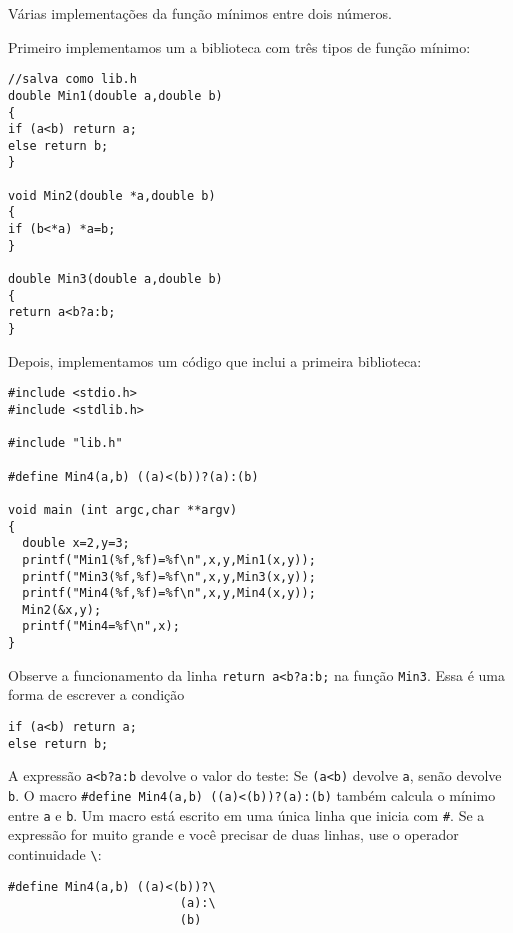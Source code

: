 \begin{ex}
Várias implementações da função mínimos entre dois números.
\end{ex}
Primeiro implementamos um a biblioteca com três tipos de função mínimo:
\begin{verbatim}
//salva como lib.h
double Min1(double a,double b)
{
if (a<b) return a;
else return b;
}

void Min2(double *a,double b)
{
if (b<*a) *a=b;
}

double Min3(double a,double b)
{
return a<b?a:b;
}
\end{verbatim}
Depois, implementamos um código que inclui a primeira biblioteca:
\begin{verbatim}
#include <stdio.h>
#include <stdlib.h>

#include "lib.h"

#define Min4(a,b) ((a)<(b))?(a):(b)

void main (int argc,char **argv)
{
  double x=2,y=3;
  printf("Min1(%f,%f)=%f\n",x,y,Min1(x,y));
  printf("Min3(%f,%f)=%f\n",x,y,Min3(x,y));
  printf("Min4(%f,%f)=%f\n",x,y,Min4(x,y));
  Min2(&x,y);
  printf("Min4=%f\n",x);
}
\end{verbatim}
Observe a funcionamento da linha \verb|return a<b?a:b;| na função \verb|Min3|. Essa é uma forma de escrever a condição
\begin{verbatim}
if (a<b) return a;
else return b;
\end{verbatim}
A expressão \verb|a<b?a:b| devolve o valor do teste: Se \verb|(a<b)| devolve \verb|a|, senão devolve \verb|b|. O macro \verb|#define Min4(a,b) ((a)<(b))?(a):(b)| também calcula o mínimo entre \verb|a| e \verb|b|. Um macro está escrito em uma única linha que inicia com \verb|#|. Se a expressão for muito grande e você precisar de duas linhas, use o operador continuidade \verb|\|:
\begin{verbatim}
#define Min4(a,b) ((a)<(b))?\
                        (a):\
                        (b)
\end{verbatim}

